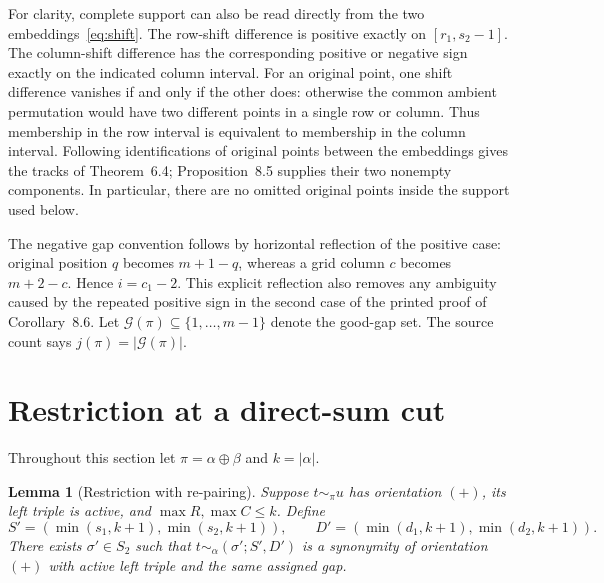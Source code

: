 \documentclass[11pt,a4paper]{article}
\newtheorem{lemma}[theorem]{Lemma}
\theoremstyle{remark}
\newcommand{\good}{\mathcal{G}}\newcommand{\skewsum}{\mathbin{\mathrm{skew}}}
\begin{document}
For clarity, complete support can also be read directly from the two
embeddings~\eqref{eq:shift}. The row-shift difference is positive exactly
on $[r_1,s_2-1]$. The column-shift difference has the corresponding
positive or negative sign exactly on the indicated column interval.
For an original point, one shift difference vanishes if and only if
the other does: otherwise the common ambient permutation would have
two different points in a single row or column. Thus membership in
the row interval is equivalent to membership in the column interval.
Following identifications of original points between the embeddings
gives the tracks of Theorem~6.4; Proposition~8.5 supplies their two
nonempty components. In particular, there are no omitted original
points inside the support used below.

The negative gap convention follows by horizontal reflection of the
positive case: original position $q$ becomes $m+1-q$, whereas a grid
column $c$ becomes $m+2-c$. Hence $i=c_1-2$. This explicit reflection
also removes any ambiguity caused by the repeated positive sign in
the second case of the printed proof of Corollary~8.6.
Let $\good(\pi)\subseteq\{1,\ldots,m-1\}$ denote the good-gap set.
The source count says $j(\pi)=|\good(\pi)|$.

\section{Restriction at a direct-sum cut}

Throughout this section let $\pi=\alpha\oplus\beta$ and $k=|\alpha|$.

\begin{lemma}[Restriction with re-pairing]\label{lem:repair}
Suppose $t\sim_\pi u$ has orientation $(+)$, its left triple is active,
and $\max R,\max C\le k$. Define
\[
 S'=(\min(s_1,k+1),\min(s_2,k+1)),\qquad
 D'=(\min(d_1,k+1),\min(d_2,k+1)).
\]
There exists $\sigma'\in S_2$ such that
$t\sim_\alpha(\sigma';S',D')$ is a synonymity of orientation $(+)$
with active left triple and the same assigned gap.
\end{lemma}
\end{document}

